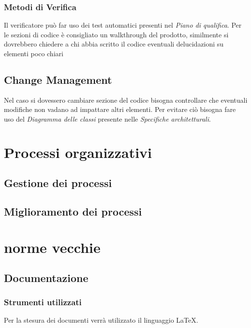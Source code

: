 \documentclass[a4paper, 12pt]{article}
\begin{document}
\subsubsection{Metodi di Verifica}
Il verificatore può far uso dei test automatici presenti nel \textit{Piano di qualifica}.
Per le sezioni di codice è consigliato un walkthrough del prodotto, similmente si dovrebbero chiedere a chi abbia scritto il codice eventuali delucidazioni su elementi poco chiari 
\subsection{Change Management}
Nel caso si dovessero cambiare sezione del codice bisogna controllare che eventuali modifiche non vadano ad impattare altri elementi. Per evitare ciò bisogna fare uso del \textit{Diagramma delle classi} presente nelle \textit{Specifiche architetturali}.
\section{Processi organizzativi}
\subsection{Gestione dei processi}
\subsection{Miglioramento dei processi}

\pagebreak
\section{norme vecchie}
\subsection{Documentazione}\label{documentazione}

\subsubsection{Strumenti utilizzati}
Per la stesura dei documenti verrà utilizzato il linguaggio \LaTeX.
\end{document}
